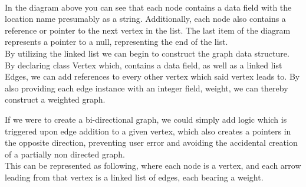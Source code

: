 \documentclass[a4paper]{article}
\begin{document}
 \\


In the diagram above you can see that each node
contains a data field with the location name presumably as a string. 
Additionally, each node also contains a reference or pointer to 
the next vertex in the list. The last item of the diagram represents a pointer to 
a null, representing the end of the list. \\


By utilizing the linked list we can begin to construct the graph data structure.
By declaring class Vertex which, contains a data field, as well as a linked list Edges, 
we can add references to every other vertex which said vertex leads to.
By also providing each edge instance with an integer field, weight,
we can thereby construct a weighted graph.

If we were to create a bi-directional graph, we could simply add logic which is triggered upon
edge addition to a given vertex, which also creates a pointers in the opposite direction, 
preventing user error and avoiding the accidental creation of a partially non directed graph. \\

\newpage
This can be represented as following, where each node is a vertex, and each arrow leading 
from that vertex is a linked list of edges, each bearing a weight. \\
\end{document}
